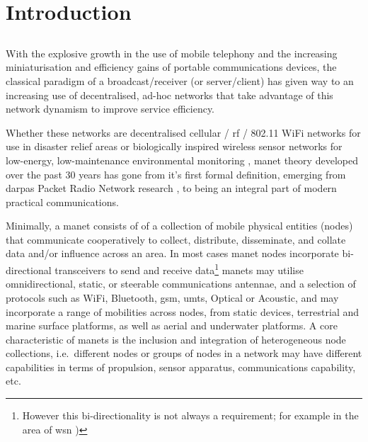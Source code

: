 
\chapter{Introduction}
\label{ch:introduction}

\section{}\label{manets}

With the explosive growth in the use of mobile telephony and the increasing miniaturisation and efficiency gains of portable communications devices, the classical paradigm of a broadcast/receiver (or server/client) has given way to an increasing use of decentralised, ad-hoc networks that take advantage of this network dynamism to improve service efficiency.

Whether these networks are decentralised cellular / \gls{rf} / 802.11 WiFi networks for use in disaster relief areas \cite{Milliken2015} or biologically inspired wireless sensor networks for low-energy, low-maintenance environmental monitoring \cite{Nicholson2008,Selvakennedy2007}, \gls{manet} theory developed over the past 30 years has gone from it's first formal definition, emerging from \glspl{darpa} Packet Radio Network research \cite{Jubin1987}, to being an integral part of modern practical communications.

Minimally, a \gls{manet} consists of of a collection of mobile physical entities (nodes) that communicate cooperatively to collect, distribute, disseminate, and collate data and/or influence across an area.
In most cases \gls{manet} nodes incorporate bi-directional transceivers to send and receive data\footnote{However this bi-directionality is not always a requirement; for example in the area of \gls{wsn} \cite{Akyildiz2002})}
\glspl{manet} may utilise omnidirectional, static, or steerable communications antennae, and a selection of protocols such as WiFi, Bluetooth, \gls{gsm}, \gls{umts}, Optical or Acoustic, and may incorporate a range of mobilities across nodes, from static devices, terrestrial and marine surface platforms, as well as aerial and underwater platforms.
A core characteristic of \glspl{manet} is the inclusion and integration of heterogeneous node collections, i.e.\ different nodes or groups of nodes in a network may have different capabilities in terms of propulsion, sensor apparatus, communications capability, etc.

